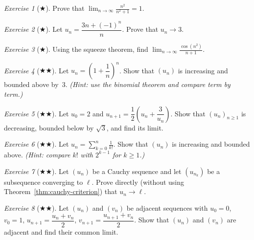 \documentclass[12pt,a4paper,openany]{book}
\theoremstyle{definition}
\theoremstyle{remark}
\newtheorem{exercise}{Exercise}[chapter]
\begin{document}
\begin{exercise}[$\bigstar$]\label{exo:seq2}
Prove that $\displaystyle\lim_{n\to\infty}\frac{n^2}{n^2+1} = 1$.
\end{exercise}

\begin{exercise}[$\bigstar$]\label{exo:seq3}
Let $u_n = \dfrac{3n+(-1)^n}{n}$. Prove that $u_n \to 3$.
\end{exercise}

\begin{exercise}[$\bigstar$]\label{exo:seq4}
Using the squeeze theorem, find $\displaystyle\lim_{n\to\infty}\frac{\cos(n^2)}{n+1}$.
\end{exercise}

\begin{exercise}[$\bigstar\bigstar$]\label{exo:seq5}
Let $u_n = \left(1 + \dfrac{1}{n}\right)^n$. Show that $(u_n)$ is increasing
and bounded above by~$3$.
\textit{(Hint: use the binomial theorem and compare term by term.)}
\end{exercise}

\begin{exercise}[$\bigstar\bigstar$]\label{exo:seq6}
Let $u_0 = 2$ and $u_{n+1} = \dfrac{1}{2}\!\left(u_n + \dfrac{3}{u_n}\right)$.
Show that $(u_n)_{n\geq 1}$ is decreasing, bounded below by $\sqrt{3}$, and
find its limit.
\end{exercise}

\begin{exercise}[$\bigstar\bigstar$]\label{exo:seq7}
Let $u_n = \displaystyle\sum_{k=0}^{n}\frac{1}{k!}$.
Show that $(u_n)$ is increasing and bounded above.
\textit{(Hint: compare $k!$ with $2^{k-1}$ for $k \geq 1$.)}
\end{exercise}

\begin{exercise}[$\bigstar\bigstar$]\label{exo:seq8}
Let $(u_n)$ be a Cauchy sequence and let $(u_{n_k})$ be a subsequence
converging to $\ell$. Prove directly (without using
Theorem~\ref{thm:cauchy-criterion}) that $u_n \to \ell$.
\end{exercise}

\begin{exercise}[$\bigstar\bigstar$]\label{exo:seq9}
Let $(u_n)$ and $(v_n)$ be adjacent sequences with $u_0 = 0$, $v_0 = 1$,
$u_{n+1} = \dfrac{u_n + v_n}{2}$, $v_{n+1} = \dfrac{u_{n+1} + v_n}{2}$.
Show that $(u_n)$ and $(v_n)$ are adjacent and find their common limit.
\end{exercise}
\end{document}
